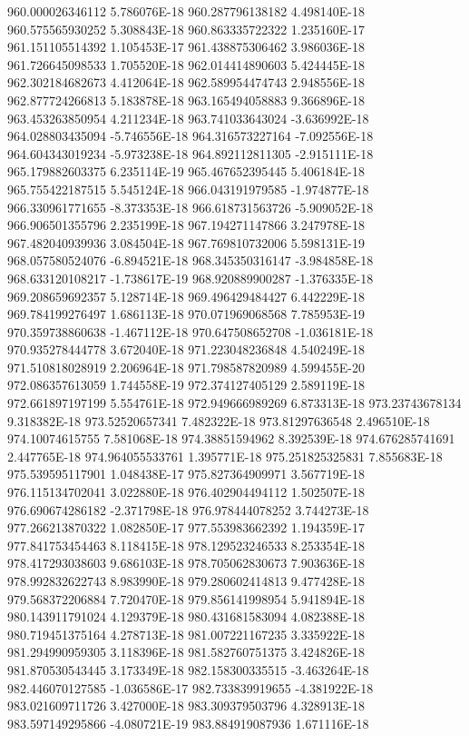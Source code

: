 960.000026346112  5.786076E-18
960.287796138182  4.498140E-18
960.575565930252  5.308843E-18
960.863335722322  1.235160E-17
961.151105514392  1.105453E-17
961.438875306462  3.986036E-18
961.726645098533  1.705520E-18
962.014414890603  5.424445E-18
962.302184682673  4.412064E-18
962.589954474743  2.948556E-18
962.877724266813  5.183878E-18
963.165494058883  9.366896E-18
963.453263850954  4.211234E-18
963.741033643024  -3.636992E-18
964.028803435094  -5.746556E-18
964.316573227164  -7.092556E-18
964.604343019234  -5.973238E-18
964.892112811305  -2.915111E-18
965.179882603375  6.235114E-19
965.467652395445  5.406184E-18
965.755422187515  5.545124E-18
966.043191979585  -1.974877E-18
966.330961771655  -8.373353E-18
966.618731563726  -5.909052E-18
966.906501355796  2.235199E-18
967.194271147866  3.247978E-18
967.482040939936  3.084504E-18
967.769810732006  5.598131E-19
968.057580524076  -6.894521E-18
968.345350316147  -3.984858E-18
968.633120108217  -1.738617E-19
968.920889900287  -1.376335E-18
969.208659692357  5.128714E-18
969.496429484427  6.442229E-18
969.784199276497  1.686113E-18
970.071969068568  7.785953E-19
970.359738860638  -1.467112E-18
970.647508652708  -1.036181E-18
970.935278444778  3.672040E-18
971.223048236848  4.540249E-18
971.510818028919  2.206964E-18
971.798587820989  4.599455E-20
972.086357613059  1.744558E-19
972.374127405129  2.589119E-18
972.661897197199  5.554761E-18
972.949666989269  6.873313E-18
973.23743678134  9.318382E-18
973.52520657341  7.482322E-18
973.81297636548  2.496510E-18
974.10074615755  7.581068E-18
974.38851594962  8.392539E-18
974.676285741691  2.447765E-18
974.964055533761  1.395771E-18
975.251825325831  7.855683E-18
975.539595117901  1.048438E-17
975.827364909971  3.567719E-18
976.115134702041  3.022880E-18
976.402904494112  1.502507E-18
976.690674286182  -2.371798E-18
976.978444078252  3.744273E-18
977.266213870322  1.082850E-17
977.553983662392  1.194359E-17
977.841753454463  8.118415E-18
978.129523246533  8.253354E-18
978.417293038603  9.686103E-18
978.705062830673  7.903636E-18
978.992832622743  8.983990E-18
979.280602414813  9.477428E-18
979.568372206884  7.720470E-18
979.856141998954  5.941894E-18
980.143911791024  4.129379E-18
980.431681583094  4.082388E-18
980.719451375164  4.278713E-18
981.007221167235  3.335922E-18
981.294990959305  3.118396E-18
981.582760751375  3.424826E-18
981.870530543445  3.173349E-18
982.158300335515  -3.463264E-18
982.446070127585  -1.036586E-17
982.733839919655  -4.381922E-18
983.021609711726  3.427000E-18
983.309379503796  4.328913E-18
983.597149295866  -4.080721E-19
983.884919087936  1.671116E-18
